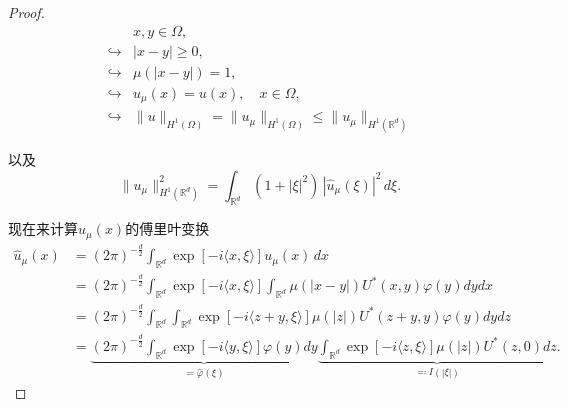 \begin{proof}
\begin{equation*}
\begin{split}
  &x,y \in \Omega, \\
  \hookrightarrow & \big| x - y \big| \ge 0,  \\
  \hookrightarrow & \mu ( | x - y | ) =1, \\
  \hookrightarrow & u_{\mu}(x) = u(x), \quad x \in \Omega, \\
  \hookrightarrow & \big\| u \big\|_{H^{1}(\Omega)} = \big\|u_{\mu}\big\|_{H^{1}(\Omega)} \le \big\| u_{\mu} \big\|_{H^{1}(\mathbb{R}^d)}
\end{split}
\end{equation*}

以及
\begin{equation}
  \label{eq:bvp-newton-potential-umunorm}
  \big\| u_{\mu} \big\|_{H^{1}(\mathbb{R}^d)}^2 = \int_{\mathbb{R}^d}
  \left( 1+ |\xi|^2 \right) \, |\widehat{u}_{\mu} (\xi) |^2 \, d \xi.
\end{equation}

现在来计算$u_{\mu}(x)$的傅里叶变换
\begin{equation}
  \label{eq:bvp-newton-potential-umux-fourier-transform-middle}
\begin{split}
  \widehat{u}_{\mu}(x) &= \left( 2 \pi \right)^{-\frac{d}{2}}
  \int_{\mathbb{R}^d}
  \exp \left[ - i \langle x, \xi \rangle \right] u_{\mu}(x) \, dx \\
  & =  \left( 2 \pi \right)^{-\frac{d}{2}}
  \int_{\mathbb{R}^{d}} \exp \left[ - i \langle x, \xi \rangle \right]
  \int_{\mathbb{R}^{d}} \mu (|x - y |) U^{*}(x,y) \varphi(y) d y d x \\
  &= \left( 2 \pi \right)^{-\frac{d}{2}}
  \int_{\mathbb{R}^d} \int_{\mathbb{R}^d}
  \exp \left[ -i \langle z + y, \xi \rangle \right]
  \mu(|z|)
  U^{*}(z+y,y)
  \varphi(y)
  dy dz \\
  &= \underbrace
  {\left( 2 \pi \right)^{-\frac{d}{2}}
  \int_{\mathbb{R}^{d}} \exp \left[ -i \langle y, \xi \rangle \right]
  \varphi(y) dy
  }_{ = \widehat{\varphi}(\xi)}
  \underbrace{
  \int_{\mathbb{R}^{d}} \exp \left[ -i \langle z, \xi \rangle \right]
  \mu(|z|) U^{*}(z,0) dz
  }_{\eqqcolon I(|\xi|)}.
\end{split}
\end{equation}


\end{proof}
